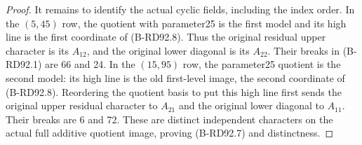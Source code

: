\begin{proof}
It remains to identify the actual cyclic fields, including the
index order. In the \((5,45)\) row, the quotient with parameter25
is the first model and its high line is the first coordinate of
(B-RD92.8). Thus the original residual upper character is its
\(A_{12}\), and the original lower diagonal is its \(A_{22}\).
Their breaks in (B-RD92.1) are 66 and 24. In the \((15,95)\)
row, the parameter25 quotient is the second model: its high line
is the old first-level image, the second coordinate of
(B-RD92.8). Reordering the quotient basis to put this high line
first sends the original upper residual character to \(A_{21}\)
and the original lower diagonal to \(A_{11}\). Their breaks are
6 and 72. These are distinct independent characters on the actual
full additive quotient image, proving (B-RD92.7) and distinctness.
\end{proof}

